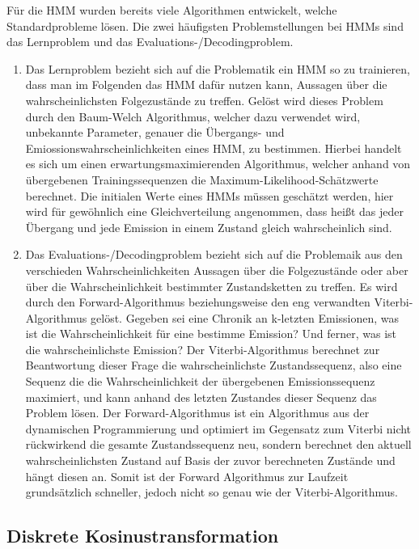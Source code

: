 Für die HMM wurden bereits viele Algorithmen entwickelt, welche Standardprobleme lösen.
Die zwei häufigsten Problemstellungen bei HMMs sind das Lernproblem und das Evaluations-/Decodingproblem.
\begin{enumerate}
	\item Das Lernproblem bezieht sich auf die Problematik ein HMM so zu trainieren, dass man im Folgenden das HMM dafür nutzen kann, Aussagen über die wahrscheinlichsten Folgezustände zu treffen.
Gelöst wird dieses Problem durch den Baum-Welch Algorithmus, welcher dazu verwendet wird, unbekannte Parameter, genauer die Übergangs- und Emiossionswahrscheinlichkeiten eines HMM, zu bestimmen.
 Hierbei handelt es sich um einen erwartungsmaximierenden Algorithmus, welcher anhand von übergebenen Trainingssequenzen die Maximum-Likelihood-Schätzwerte berechnet.
 Die initialen Werte eines HMMs müssen geschätzt werden, hier wird für gewöhnlich eine Gleichverteilung angenommen, dass heißt das jeder Übergang und jede Emission in einem Zustand gleich wahrscheinlich sind.
	\item Das Evaluations-/Decodingproblem bezieht sich auf die Problemaik aus den verschieden Wahrscheinlichkeiten Aussagen über die Folgezustände oder aber über die Wahrscheinlichkeit bestimmter Zustandsketten zu treffen.
Es wird durch den Forward-Algorithmus beziehungsweise den eng verwandten Viterbi-Algorithmus gelöst.
Gegeben sei eine Chronik an k-letzten Emissionen, was ist die Wahrscheinlichkeit für eine bestimme Emission? Und ferner, was ist die wahrscheinlichste Emission? Der Viterbi-Algorithmus berechnet zur Beantwortung dieser Frage die wahrscheinlichste Zustandssequenz, also eine Sequenz die die Wahrscheinlichkeit der übergebenen Emissionssequenz maximiert, und kann anhand des letzten Zustandes dieser Sequenz das Problem lösen.
Der Forward-Algorithmus ist ein Algorithmus aus der dynamischen Programmierung und optimiert im Gegensatz zum Viterbi nicht rückwirkend die gesamte Zustandssequenz neu, sondern berechnet den aktuell wahrscheinlichsten Zustand auf Basis der zuvor berechneten Zustände und hängt diesen an.
Somit ist der Forward Algorithmus zur Laufzeit grundsätzlich schneller, jedoch nicht so genau wie der Viterbi-Algorithmus.
 \end{enumerate}


\subsection{Diskrete Kosinustransformation}
\label{sec:dct}

